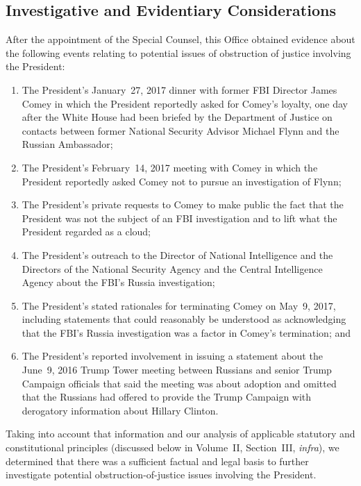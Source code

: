 \subsection{Investigative and Evidentiary Considerations}

After the appointment of the Special Counsel, this Office obtained evidence about the following events relating to potential issues of obstruction of justice involving the President:

\renewcommand{\labelenumi}{(\alph{enumi})}
\begin{enumerate}
    \item The President's January~27, 2017 dinner with former FBI Director James Comey in which the President reportedly asked for Comey's loyalty, one day after the White House had been briefed by the Department of Justice on contacts between former National Security Advisor Michael Flynn and the Russian Ambassador;

    \item The President's February~14, 2017 meeting with Comey in which the President reportedly asked Comey not to pursue an investigation of Flynn;

    \item The President's private requests to Comey to make public the fact that the President was not the subject of an FBI investigation and to lift what the President regarded as a cloud;

    \item The President's outreach to the Director of National Intelligence and the Directors of the National Security Agency and the Central Intelligence Agency about the FBI's Russia investigation;

    \item The President's stated rationales for terminating Comey on May~9, 2017, including statements that could reasonably be understood as acknowledging that the FBI's Russia investigation was a factor in Comey's termination; and

    \item The President's reported involvement in issuing a statement about the June~9, 2016 Trump Tower meeting between Russians and senior Trump Campaign officials that said the meeting was about adoption and omitted that the Russians had offered to provide the Trump Campaign with derogatory information about Hillary Clinton.
\end{enumerate}

Taking into account that information and our analysis of applicable statutory and constitutional principles (discussed below in Volume~II, Section~III, \textit{infra}), we determined that there was a sufficient factual and legal basis to further investigate potential obstruction-of-justice issues involving the President.

